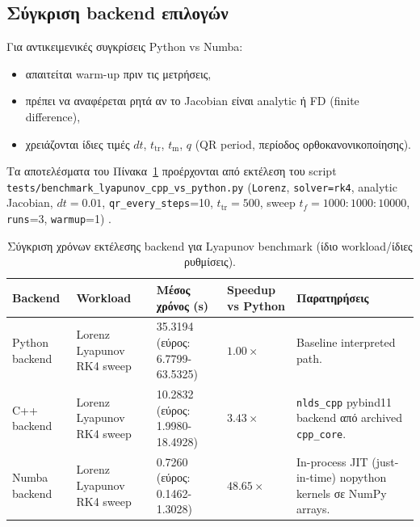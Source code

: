 \documentclass[11pt,a4paper]{report}
\begin{document}
\subsection{Σύγκριση backend επιλογών}
\label{subsec:backend-options-comparison}

\begin{guidebox}
Για αντικειμενικές συγκρίσεις Python vs Numba:
\begin{itemize}
\item απαιτείται warm-up πριν τις μετρήσεις,
\item πρέπει να αναφέρεται ρητά αν το Jacobian είναι analytic ή FD (finite difference),
\item χρειάζονται ίδιες τιμές \(dt\), \(t_{\mathrm{tr}}\), \(t_{\mathrm{m}}\), \(q\) (QR period, περίοδος ορθοκανονικοποίησης).
\end{itemize}
\end{guidebox}

\begin{resultsbox}
Τα αποτελέσματα του Πίνακα~\ref{tab:ch2-backend-runtime} προέρχονται από
εκτέλεση του script \texttt{tests/benchmark\_lyapunov\_cpp\_vs\_python.py}
(\texttt{Lorenz}, \texttt{solver=rk4}, analytic Jacobian,
\(dt=0.01\), \texttt{qr\_every\_steps}=10, \(t_{\mathrm{tr}}=500\),
sweep \(t_f=1000{:}1000{:}10000\), \texttt{runs}=3, \texttt{warmup}=1)
\cite{nlds_internal_scripts}.
\end{resultsbox}

\begin{table}[H]
\centering
\caption{Σύγκριση χρόνων εκτέλεσης backend για Lyapunov benchmark (ίδιο workload/ίδιες ρυθμίσεις).}
\label{tab:ch2-backend-runtime}
\renewcommand{\arraystretch}{1.15}
{\setlength{\tabcolsep}{4pt}
\begin{tabular}{|p{}|p{}|p{}|p{}|p{}|}
\hline
\textbf{Backend} & \textbf{Workload} & \textbf{Μέσος χρόνος (s)} & \textbf{Speedup vs Python} & \textbf{Παρατηρήσεις} \\
\hline
Python backend & Lorenz Lyapunov RK4 sweep & 35.3194 (εύρος: 6.7799-63.5325) & $1.00\times$ & Baseline interpreted path. \\
\hline
C++ backend & Lorenz Lyapunov RK4 sweep & 10.2832 (εύρος: 1.9980-18.4928) & $3.43\times$ & \texttt{nlds\_cpp} pybind11 backend από archived \texttt{cpp\_core}. \\
\hline
Numba backend & Lorenz Lyapunov RK4 sweep & 0.7260 (εύρος: 0.1462-1.3028) & $48.65\times$ & In-process JIT (just-in-time) nopython kernels σε NumPy arrays. \\
\hline
\end{tabular}
}
\end{table}
\end{document}
